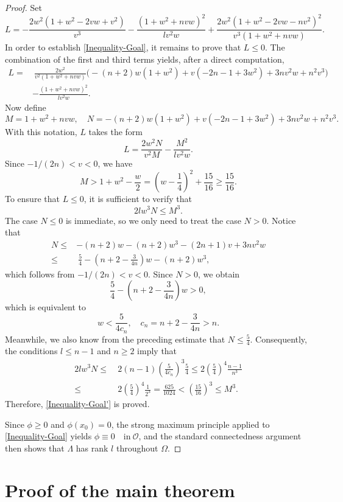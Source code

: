 \documentclass[11pt]{amsart}
\numberwithin{theorem}{section}
\numberwithin{equation}{section}
\begin{document}
\begin{proof}
Set $$L=-\frac{2w^2(1+w^2-2vw+v^2)}{v^3}-\frac{(1+w^2+nvw)^2}{lv^2w}+\frac{2w^2(1+w^2-2vw-nv^2)^2}{v^3(1+w^2+nvw)}.$$ In order to establish \eqref{Inequality-Goal}, it remains to prove that $L\leq 0$. The combination of the first and third terms yields, after a direct computation,
\begin{align*}
L
=&~\frac{2w^2}{v^2(1+w^2+nvw)}\big(-(n+2)w(1+w^2)+v(-2n-1+3w^2)+3nv^2w+n^2v^3\big)\\
&-\frac{(1+w^2+nvw)^2}{lv^2w}.
\end{align*}
Now define $$M=1+w^2+nvw,\quad N=-(n+2)w(1+w^2)+v(-2n-1+3w^2)+3nv^2w+n^2v^3.$$ With this notation, $L$ takes the form $$L=\frac{2w^2N}{v^2M}-\frac{M^2}{lv^2w}.$$ Since $-1/(2n)<v<0$, we have $$M>1+w^2-\frac{w}{2}=\left(w-\frac{1}{4}\right)^2+\frac{15}{16}\geq\frac{15}{16}.$$ To ensure that $L\leq 0$, it is sufficient to verify that
\begin{equation}\label{Inequality-Goal'}
2lw^3N\leq M^3.
\end{equation}
The case $N\leq 0$ is immediate, so we only need to treat the case $N>0$. Notice that
\begin{align*}
N
\leq&-(n+2)w-(n+2)w^3-(2n+1)v+3nv^2w\\
\leq&~\frac{5}{4}-\left(n+2-\frac{3}{4n}\right)w-(n+2)w^3,
\end{align*}
which follows from $-1/(2n)<v<0$. Since $N>0$, we obtain $$\frac{5}{4}-\left(n+2-\frac{3}{4n}\right)w>0,$$ which is equivalent to $$w<\frac{5}{4c_n},\quad c_n=n+2-\frac{3}{4n}>n.$$ Meanwhile, we also know from the preceding estimate that $N\leq\frac{5}{4}$. Consequently, the conditions $l\leq n-1$ and $n\geq 2$ imply that
\begin{align*}
2lw^3N
\leq&~2(n-1)\left(\frac{5}{4c_n}\right)^3\frac{5}{4}\leq2\left(\frac{5}{4}\right)^4\frac{n-1}{n^3}\\
\leq&~2\left(\frac{5}{4}\right)^4\frac{1}{2^3}=\frac{625}{1024}<\left(\frac{15}{16}\right)^3\leq M^3.
\end{align*}
Therefore, \eqref{Inequality-Goal'} is proved.

Since $\phi\geq 0$ and $\phi(x_0)=0$, the strong maximum principle applied to \eqref{Inequality-Goal} yields $\phi\equiv 0\quad\mathrm{in}\ \mathcal{O}$, and the standard connectedness argument then shows that $\Lambda$ has rank $l$ throughout $\Omega$.

\end{proof}

\section{Proof of the main theorem}\label{Section 6}
\end{document}

